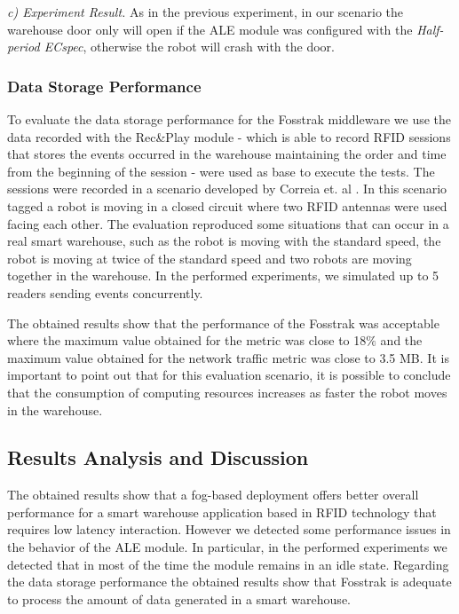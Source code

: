 \textit{c) Experiment Result.}
As in the previous experiment, in our scenario the warehouse door only will open if the \gls{ALE}
module was configured with the \textit{Half-period ECspec}, otherwise the robot will crash with
the door.

\subsubsection{Data Storage Performance}
\label{subs:data_storage_performance}
To evaluate the data storage performance for the Fosstrak middleware we use the data recorded with
the Rec\&Play module - which is able to record \gls{RFID} sessions that stores the events occurred
in the warehouse maintaining the order and time from the beginning of the session - were used as
base to execute the tests. The sessions were recorded in a scenario developed by Correia et. al \cite{Correia:Thesis:2014}.
In this scenario tagged a robot is moving in a closed circuit where two RFID antennas were used facing
each other. The evaluation reproduced some situations that can occur in a real smart warehouse,
such as the robot is moving with the standard speed, the robot is moving at twice of the standard
speed and two robots are moving together in the warehouse. In the performed experiments, we
simulated up to 5 readers sending events concurrently.

The obtained results show that the performance of the Fosstrak was acceptable where the maximum
value obtained for the  metric was close to 18$\%$ and the maximum
value obtained for the network traffic metric was close to 3.5 \gls{MB}. It is important
to point out that for this evaluation scenario, it is possible to conclude that the consumption
of computing resources increases as faster the robot moves in the warehouse.

\subsection{Results Analysis and Discussion}
\label{sub:results_analysis_discussion}
The obtained results show that a fog-based deployment offers better overall performance for a
smart warehouse application based in RFID technology that requires low latency interaction. However
we detected some performance issues in the behavior of the \gls{ALE} module. In particular, in the
performed experiments we detected that in most of the time the module remains in an idle state.
Regarding the data storage performance the obtained results show that Fosstrak is adequate
to process the amount of data generated in a smart warehouse.
